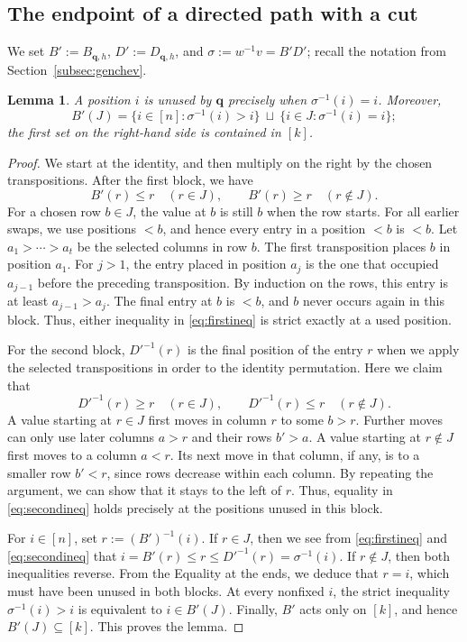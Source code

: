 \documentclass[11pt,a4paper,reqno]{amsart}
\DeclareRobustCommand{\rev}[1]{{\color{revision}#1}}
\numberwithin{equation}{section}
\newtheorem{lemma}[theorem]{Lemma}
\theoremstyle{definition}
\newcommand{\qq}{\mathbf q}
\begin{document}
\subsection{The endpoint of a directed path with a cut}
We set \(B':=B_{\qq,h}\), \(D':=D_{\qq,h}\), and \(\sigma:=w^{-1}v=B'D'\); recall the notation from Section~\ref{subsec:genchev}. 
\begin{lemma}\label{lem:cutend}
A position \(i\) is unused by \(\qq\) precisely when \(\sigma^{-1}(i)=i\). Moreover,
\[
 B'(J)=\{i\in[n]:\sigma^{-1}(i)>i\}
          \ \sqcup\ \{i\in J:\sigma^{-1}(i)=i\};
\]
the first set on the right-hand side is contained in \([k]\).
\end{lemma}
\begin{proof}
We start at the identity, and then multiply on the right by the chosen transpositions. After the first block, we have 
\begin{equation}\label{eq:firstineq}
 B'(r)\le r\quad(r\in J),\qquad B'(r)\ge r\quad(r\notin J).
\end{equation}
For a chosen row \(b\in J\), the value at \(b\) is still \(b\) when the row starts. For all earlier swaps, we use positions \(<b\), and hence every entry in a position \(<b\) is \(<b\). Let \(a_1>\cdots>a_t\) be the selected columns in row \(b\). The first transposition places \(b\) in position \(a_1\). For \(j>1\), the entry placed in position \(a_j\) is the one that occupied \(a_{j-1}\) before the preceding transposition. By induction on the rows, this entry is at least \(a_{j-1}>a_j\). The final entry at \(b\) is \(<b\), and \(b\) never occurs again in this block. Thus, either inequality in \eqref{eq:firstineq} is strict exactly at a used position.

For the second block, \(D'^{-1}(r)\) is the final position of the entry \(r\) when we apply the selected transpositions in order to the identity permutation. Here we claim that
\begin{equation}\label{eq:secondineq}
 D'^{-1}(r)\ge r\quad(r\in J),\qquad D'^{-1}(r)\le r\quad(r\notin J).
\end{equation}
A value starting at \(r\in J\) first moves in column \(r\) to some \(b>r\). Further moves can only use later columns \(a>r\) and their rows \(b'>a\). A value starting at \(r\notin J\) first moves to a column \(a<r\). Its next move in that column, if any, is to a smaller row \(b'<r\), since rows decrease within each column. By repeating the argument, we can show that it stays to the left of \(r\). Thus, equality in \eqref{eq:secondineq} holds precisely at the positions unused in this block.

\rev{For \(i\in[n]\), set \(r:=(B')^{-1}(i)\). If \(r\in J\), then we see from \eqref{eq:firstineq} and \eqref{eq:secondineq} that}
\(i=B'(r)\le r\le D'^{-1}(r)=\sigma^{-1}(i)\). If \(r\notin J\), then both inequalities reverse. From the Equality at the ends, we deduce that \(r=i\), which must have been unused in both blocks. At every nonfixed \(i\), the strict inequality \(\sigma^{-1}(i)>i\) is equivalent to \(i\in B'(J)\). Finally, \(B'\) acts only on \([k]\), and hence \(B'(J)\subseteq[k]\). This proves the lemma.
\end{proof}
\end{document}
